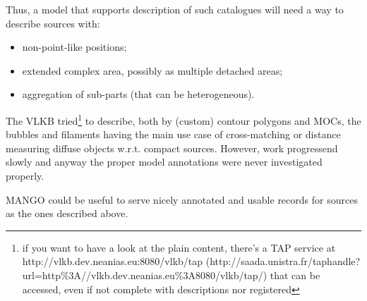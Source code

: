 Thus, a model that supports description of such catalogues will need a
way to describe sources with:
\begin{itemize}
	\item non-point-like positions;
	\item extended complex area, possibly as multiple detached areas;
	\item aggregation of sub-parts (that can be heterogeneous).
\end{itemize}

The VLKB tried\footnote{if you want to have a look at the plain
content, there's a TAP service at
http://vlkb.dev.neanias.eu:8080/vlkb/tap (http://saada.unistra.fr/taphandle?url=http\%3A//vlkb.dev.neanias.eu\%3A8080/vlkb/tap/) that can be accessed, even if
not complete with descriptions nor registered} to describe, both by
(custom) contour polygons and MOCs,
the bubbles and filaments having the main use case of cross-matching or
distance measuring diffuse objects w.r.t. compact sources. However, work
progressend slowly and anyway the proper model annotations were never
investigated properly.

MANGO could be useful to serve nicely annotated and usable records for
sources as the ones described above.